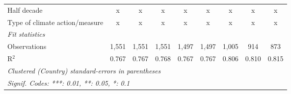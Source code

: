 \begin{tabular}{lcccccccc}
   Half decade                                                            & x            & x            & x            & x            & x            & x             & x            & x\\  
   Type of climate action/measure                                         & x            & x            & x            & x            & x            & x             & x            & x\\  
   \midrule \emph{Fit statistics}\\
   Observations                                                           & 1,551        & 1,551        & 1,551        & 1,497        & 1,497        & 1,005         & 914          & 873\\  
   R$^2$                                                                  & 0.767        & 0.767        & 0.768        & 0.767        & 0.767        & 0.806         & 0.810        & 0.815\\  
   \midrule
   \multicolumn{9}{l}{\emph{Clustered (Country) standard-errors in parentheses}}\\
   \multicolumn{9}{l}{\emph{Signif. Codes: ***: 0.01, **: 0.05, *: 0.1}}\\
\end{tabular}
\par\endgroup


